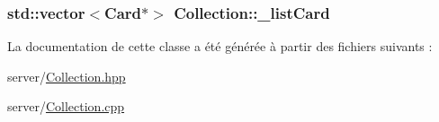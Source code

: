 \subsubsection[{\+\_\+list\+Card}]{\setlength{\rightskip}{0pt plus 5cm}std\+::vector$<${\bf Card}$\ast$$>$ Collection\+::\+\_\+list\+Card\hspace{0.3cm}{\ttfamily [protected]}}\label{classCollection_aebfdc5b0559ab8a0c350a24c9d24f564}


La documentation de cette classe a été générée à partir des fichiers suivants \+:\begin{DoxyCompactItemize}
\item 
server/\hyperlink{Collection_8hpp}{Collection.\+hpp}\item 
server/\hyperlink{Collection_8cpp}{Collection.\+cpp}\end{DoxyCompactItemize}
